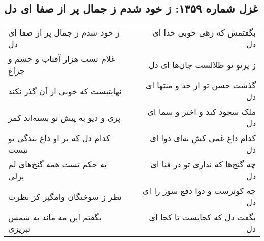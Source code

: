 \begin{center}
\section*{غزل شماره ۱۳۵۹: ز خود شدم ز جمال پر از صفا ای دل}
\label{sec:1359}
\begin{longtable}{l p{0.5cm} r}
ز خود شدم ز جمال پر از صفا ای دل
&&
بگفتمش که زهی خوبی خدا ای دل
\\
غلام تست هزار آفتاب و چشم و چراغ
&&
ز پرتو تو ظلالست جان‌ها ای دل
\\
نهایتیست که خوبی از آن گذر نکند
&&
گذشت حسن تو از حد و منتها ای دل
\\
پری و دیو به پیش تو بسته‌اند کمر
&&
ملک سجود کند و اختر و سما ای دل
\\
کدام دل که بر او داغ بندگی تو نیست
&&
کدام داغ غمی کش نه‌ای دوا ای دل
\\
به حکم تست همه گنج‌های لم یزلی
&&
چه گنج‌ها که نداری تو در فنا ای دل
\\
نظر ز سوختگان وامگیر کز نظرت
&&
چه کوثرست و دوا دفع سوز را ای دل
\\
بگفتم این مه ماند به شمس تبریزی
&&
بگفت دل که کجایست تا کجا ای دل
\\
\end{longtable}
\end{center}
